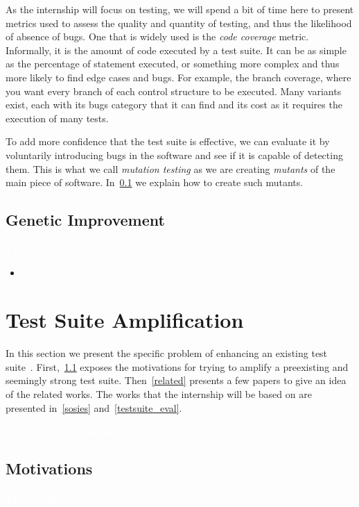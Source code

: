\documentclass[11pt]{sdm}
\newcommand{\addref}[1]{\colorbox{TealBlue!100}{\textcolor{white}{\textbf{$[$\ifx&#1&\ \else#1\fi$]$}}}}
\newcommand{\todo}[1]{\colorbox{Red!75}{\textcolor{white}{\textbf{TODO\ifx&#1&\else: #1\fi}}}}
\begin{document}
As the internship will focus on testing, we will spend a bit of time here to present metrics used to assess the quality and quantity of testing, and thus the likelihood of absence of bugs.
One that is widely used is the \textit{code coverage} metric.
Informally, it is the amount of code executed by a test suite.
It can be as simple as the percentage of statement executed, or something more complex and thus more likely to find edge cases and bugs.
For example, the branch coverage, where you want every branch of each control structure to be executed.
Many variants exist, each with its bugs category that it can find and its cost as it requires the execution of many tests.

To add more confidence that the test suite is effective, we can evaluate it by voluntarily introducing bugs in the software and see if it is capable of detecting them.
This is what we call \textit{mutation testing} as we are creating \textit{mutants} of the main piece of software.
In~\ref{applications} we explain how to create such mutants.

\subsection{Genetic Improvement}
\label{applications}
\todo{}

\begin{itemize}
  \item
\end{itemize}

\cite{petke2017genetic}



\section{Test Suite Amplification}
\label{tsa}
In this section we present the specific problem of enhancing an existing test suite~\cite{danglot2017emerging}.
First,~\ref{motiv_tsa} exposes the motivations for trying to amplify a preexisting and seemingly strong test suite.
Then~\ref{related} presents a few papers to give an idea of the related works.
The works that the internship will be based on are presented in~\ref{sosies} and~\ref{testsuite_eval}.

\addref{new survey paper}

\subsection{Motivations}
\label{motiv_tsa}
\todo{}
\end{document}
